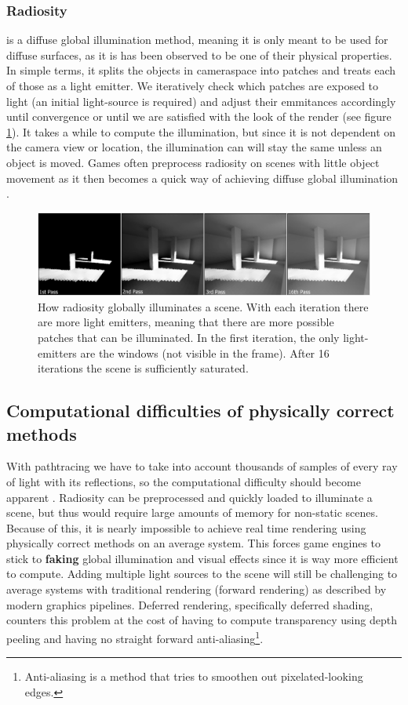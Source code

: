 \documentclass{ACGSeminar}
\begin{document}
	\subsubsection{Radiosity}
		is a diffuse global illumination method, meaning it is only meant to be used for diffuse surfaces, as it is has been observed to be one of their physical properties. In simple terms, it splits the objects in cameraspace into patches and treats each of those as a light emitter. We iteratively check which patches are exposed to light (an initial light-source is required) and adjust their emmitances accordingly until convergence or until we are satisfied with the look of the render (see figure \ref{fig:radiosity}). It takes a while to compute the illumination, but since it is not dependent on the camera view or location, the illumination can will stay the same unless an object is moved. Games often preprocess radiosity on scenes with little object movement as it then becomes a quick way of achieving diffuse global illumination \cite{RAD}.
		\begin{figure}[htb!]%
			\begin{center}%
				\includegraphics[width=16cm]{img/radiosity.png}
			\end{center}%
			\caption{How radiosity globally illuminates a scene. With each iteration there are more light emitters, meaning that there are more possible patches that can be illuminated. In the first iteration, the only light-emitters are the windows (not visible in the frame). After 16 iterations the scene is sufficiently saturated.}%
			\label{fig:radiosity}%
		\end{figure}%
	\subsection{Computational difficulties of physically correct methods}
	With pathtracing we have to take into account thousands of samples of every ray of light with its reflections, so the computational difficulty should become apparent \cite{DST}. Radiosity can be preprocessed and quickly loaded to illuminate a scene, but thus would require large amounts of memory for non-static scenes. Because of this, it is nearly impossible to achieve real time rendering using physically correct methods on an average system. This forces game engines to stick to \textbf{faking} global illumination and visual effects since it is way more efficient to compute. Adding multiple light sources to the scene will still be challenging to average systems with traditional rendering (forward rendering) as described by modern graphics pipelines. Deferred rendering, specifically deferred shading, counters this problem at the cost of having to compute transparency using depth peeling and having no straight forward anti-aliasing\footnote{Anti-aliasing is a method that tries to smoothen out pixelated-looking edges.}.
\end{document}
